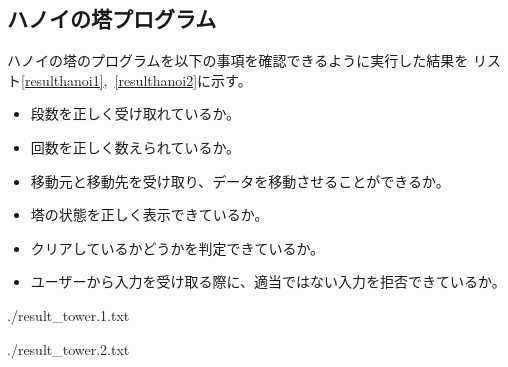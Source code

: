 \documentclass[a4j]{jarticle}
\begin{document}
\subsection{ハノイの塔プログラム}
ハノイの塔のプログラムを以下の事項を確認できるように実行した結果を
リスト\ref{resulthanoi1},~\ref{resulthanoi2}に示す。
\begin{itemize}
  \item 段数を正しく受け取れているか。
  \item 回数を正しく数えられているか。
  \item 移動元と移動先を受け取り、データを移動させることができるか。
  \item 塔の状態を正しく表示できているか。
  \item クリアしているかどうかを判定できているか。
  \item ユーザーから入力を受け取る際に、適当ではない入力を拒否できているか。
\end{itemize}

\begin{lstinputlisting}[caption=ハノイプログラムの実行結果.1,label=resulthanoi1]{./result_tower.1.txt}
\end{lstinputlisting}

\begin{lstinputlisting}[caption=ハノイプログラムの実行結果.2,label=resulthanoi2]{./result_tower.2.txt}
\end{lstinputlisting}
\end{document}
